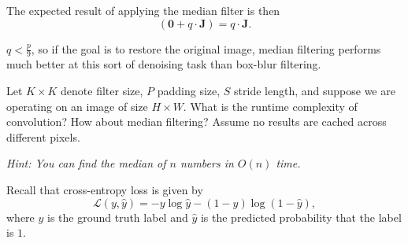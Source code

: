 \documentclass[11pt]{article}
\begin{document}
\begin{subparts}
{        The expected result of applying the median filter is then
        $$ \left( \mathbf{0} + q \cdot \mathbf{J} \right) = q \cdot \mathbf{J}.$$
        
        $q < \frac{p}{9}$, so if the goal is to restore the original image, median filtering performs much better at this sort of denoising task than box-blur filtering.
    }
    \subpart Let $K \times K$ denote filter size, $P$ padding size, $S$ stride length, and suppose we are operating on an image of size $H \times W$. What is the runtime complexity of convolution? How about median filtering? Assume no results are cached across different pixels.

    \emph{Hint: You can find the median of $n$ numbers in $O(n)$ time.}


\end{subparts}

\newpage

	Recall that cross-entropy loss is given by
    $$
    \mathcal{L}(y, \hat{y}) = - y \log \hat{y} - (1 - y) \log (1 - \hat{y}),
    $$
    where $y$ is the ground truth label and $\hat{y}$ is the predicted probability that the label is $1$.
\end{document}
